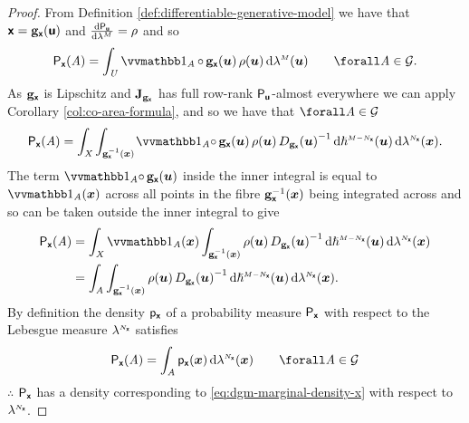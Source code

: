 \begin{proof}
From Definition \ref{def:differentiable-generative-model} we have that $\boldsymbol{\mathsf{x}} = {\mathbf{g}}_{\boldsymbol{\mathsf{x}}}(\boldsymbol{\mathsf{u}})$ and $\td{\prob{\rvct{u}}}{\lebm{M}} = \rho$ and so
\begin{equation*}
  \prob{\rvct{x}}(\set{A}) 
  =
  \int_{\set{U}} 
    \ind{\set{A}}\circ\,\genfunc_{\rvct{x}}(\vct{u})\,\rho(\vct{u})
  \,\dr\lebm{M}(\vct{u})
  \qquad \forall \set{A} \in\sset{G}.
\end{equation*}
As ${\mathbf{g}}_{\boldsymbol{\mathsf{x}}}$ is Lipschitz and $\mathbf{J}_{{\mathbf{g}}_{\boldsymbol{\mathsf{x}}}}$ has full row-rank $\mathsf{P}_{\boldsymbol{\mathsf{u}}}$-almost everywhere we can apply Corollary \ref{col:co-area-formula}, and so we have that $\forall \set{A} \in\sset{G}$
\begin{equation*}
  \prob{\rvct{x}}(\set{A}) =
  \int_{\set{X}}
  \int_{\preimage{\genfunc_{\rvct{x}}}{\vct{x}}}\kern-1pt
    \ind{\set{A}}\!\circ\,\genfunc_{\rvct{x}}(\vct{u})\,\rho(\vct{u})\,
    \jacobproddet{\genfunc_{\rvct{x}}}{\vct{u}}^{-1}
  \,\dr\haum{M-{N_{\rvct{x}}}}(\vct{u})
  \,\dr\lebm{N_{\rvct{x}}}(\vct{x}).
\end{equation*}
The term $\ind{\set{A}}\!\circ\,\genfunc_{\rvct{x}}(\vct{u})$ inside the inner integral is equal to $\ind{\set{A}}(\vct{x})$ across all points in the fibre ${\mathbf{g}}_{\boldsymbol{\mathsf{x}}}^{-1}(\boldsymbol{x})$ being integrated across and so can be taken outside the inner integral to give
\begin{align*}
  \prob{\rvct{x}}(\set{A})
  &=
  \int_{\set{X}}
  \ind{\set{A}}(\vct{x})
  \int_{\preimage{\genfunc_{\rvct{x}}}{\vct{x}}} 
   \rho(\vct{u})\,
   \jacobproddet{\genfunc_{\rvct{x}}}{\vct{u}}^{-1}
  \,\dr\haum{M-{N_{\rvct{x}}}}(\vct{u})
  \,\dr\lebm{N_{\rvct{x}}}(\vct{x})\\
  &=
  \int_{\set{A}}
  \int_{\preimage{\genfunc_{\rvct{x}}}{\vct{x}}} 
   \rho(\vct{u})\,
   \jacobproddet{\genfunc_{\rvct{x}}}{\vct{u}}^{-1}
  \,\dr\haum{M-{N_{\rvct{x}}}}(\vct{u})
  \,\dr\lebm{N_{\rvct{x}}}(\vct{x}).
\end{align*}
By definition the density $\mathsf{p}_{\boldsymbol{\mathsf{x}}}$ of a probability measure $\mathsf{P}_{\boldsymbol{\mathsf{x}}}$ with respect to the Lebesgue measure $\lebm{N_{\rvct{x}}}$ satisfies
\begin{equation*}
  \prob{\rvct{x}}(\set{A}) = \int_{\set{A}} \pden{\rvct{x}}(\vct{x}) \,\dr\lebm{N_{\rvct{x}}}(\vct{x})
  \qquad \forall \set{A} \in \sset{G}
\end{equation*}
$\therefore$ $\mathsf{P}_{\boldsymbol{\mathsf{x}}}$ has a density corresponding to \eqref{eq:dgm-marginal-density-x} with respect to $\lebm{N_{\rvct{x}}}$. \qedhere
\end{proof}
